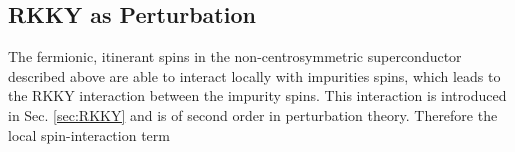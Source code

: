 \subsection{RKKY as Perturbation}
The fermionic, itinerant spins in the non-centrosymmetric superconductor described above are able to interact locally with impurities spins, which leads to the RKKY interaction between the impurity spins.
This interaction is introduced in Sec. \ref{sec:RKKY} and is of second order in perturbation theory.
Therefore the local spin-interaction term

